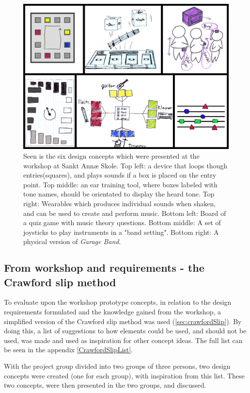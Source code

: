 \begin{figure}[H]
	\centering
	\includegraphics[width=0.9\linewidth]{figure/Design/workshopPrototypesDone} 
	\caption{Seen is the six design concepts which were presented at the workshop at Sankt Annæ Skole. Top left: a device that loops though entries(squares), and plays sounds if a box is placed on the entry point. Top middle: an ear training tool, where boxes labeled with tone names, should be orientated to display the heard tone. Top right: Wearables which produces individual sounds when shaken, and can be used to create and perform music. Bottom left: Board of a quiz game with music theory questions. Bottom middle: A set of joysticks to play instruments in a "band setting". Bottom right: A physical version of \textit{Garage Band}.}
	\label{fig:workshopPrototypes}
\end{figure}

\subsection{From workshop and requirements - the Crawford slip method}
To evaluate upon the workshop prototype concepts, in relation to the design requirements formulated and the knowledge gained from the workshop, a simplified version of the Crawford slip method was used (\autoref{sec:crawfordSlip}). By doing this, a list of suggestions to how elements could be used, and should not be used, was made and used as inspiration for other concept ideas. The full list can be seen in the appendix \autoref{CrawfordSlipList}.

With the project group divided into two groups of three persons, two design concepts were created (one for each group), with inspiration from this list. These two concepts, were then presented in the two groups, and discussed.

